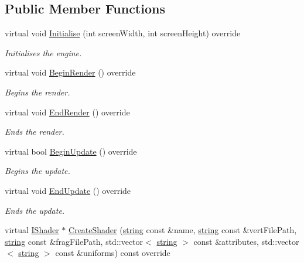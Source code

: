 \subsection*{Public Member Functions}
\begin{DoxyCompactItemize}
\item 
virtual void \hyperlink{class_d_x_engine_a8b5413a8d83f7a1a88b0dcb1e9ab378c}{Initialise} (int screen\+Width, int screen\+Height) override
\begin{DoxyCompactList}\small\item\em Initialises the engine. \end{DoxyCompactList}\item 
virtual void \hyperlink{class_d_x_engine_a11d8bf69f1673ef1715b7ffc899190e1}{Begin\+Render} () override
\begin{DoxyCompactList}\small\item\em Begins the render. \end{DoxyCompactList}\item 
virtual void \hyperlink{class_d_x_engine_a1326b18c1e4cc8e74f8337e13e0bfac0}{End\+Render} () override
\begin{DoxyCompactList}\small\item\em Ends the render. \end{DoxyCompactList}\item 
virtual bool \hyperlink{class_d_x_engine_a6dadbd253449bee8787178e47676d1f5}{Begin\+Update} () override
\begin{DoxyCompactList}\small\item\em Begins the update. \end{DoxyCompactList}\item 
virtual void \hyperlink{class_d_x_engine_a7c6c49cdd2b24a81c19ee2d52cb1045b}{End\+Update} () override
\begin{DoxyCompactList}\small\item\em Ends the update. \end{DoxyCompactList}\item 
virtual \hyperlink{class_i_shader}{I\+Shader} $\ast$ \hyperlink{class_d_x_engine_ac3f1b18e87c40707b091a7ef42656729}{Create\+Shader} (\hyperlink{_types_8h_ad453f9f71ce1f9153fb748d6bb25e454}{string} const \&name, \hyperlink{_types_8h_ad453f9f71ce1f9153fb748d6bb25e454}{string} const \&vert\+File\+Path, \hyperlink{_types_8h_ad453f9f71ce1f9153fb748d6bb25e454}{string} const \&frag\+File\+Path, std\+::vector$<$ \hyperlink{_types_8h_ad453f9f71ce1f9153fb748d6bb25e454}{string} $>$ const \&attributes, std\+::vector$<$ \hyperlink{_types_8h_ad453f9f71ce1f9153fb748d6bb25e454}{string} $>$ const \&uniforms) const  override

\end{DoxyCompactItemize}
